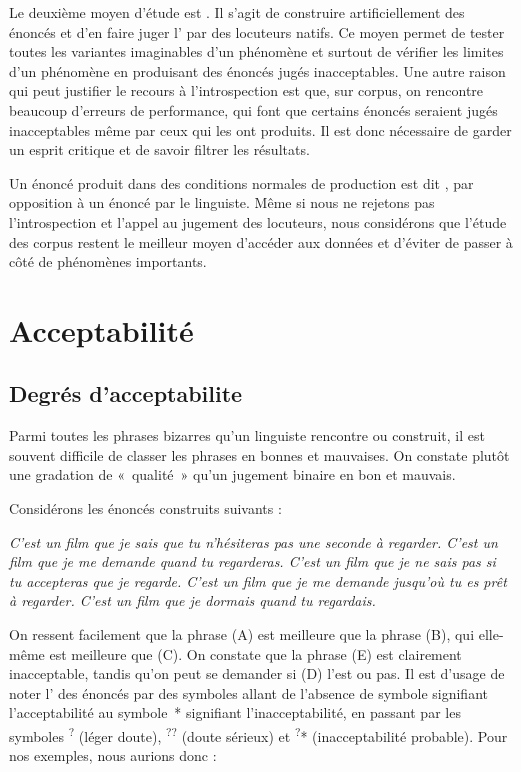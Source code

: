 Le deuxième moyen d’étude est . Il s’agit de construire artificielle\-ment des énoncés et d’en faire juger l’ par des locuteurs natifs. Ce moyen permet de tester toutes les variantes imaginables d’un phénomène et surtout de vérifier les limites d’un phénomène en produisant des énoncés jugés inacceptables. Une autre raison qui peut justifier le recours à l’introspection est que, sur corpus, on rencontre beaucoup d’erreurs de performance, qui font que certains énoncés seraient jugés inacceptables même par ceux qui les ont produits. Il est donc nécessaire de garder un esprit critique et de savoir filtrer les résultats.

Un énoncé produit dans des conditions normales de production est dit , par opposition à un énoncé  par le linguiste. Même si nous ne rejetons pas l’introspection et l’appel au jugement des locuteurs, nous considérons que l’étude des corpus restent le meilleur moyen d’accéder aux données et d’éviter de passer à côté de phénomènes importants.

\section{Acceptabilité}\label{sec:1.1.11}
\subsection{Degrés d'acceptabilite}
Parmi toutes les phrases bizarres qu’un linguiste rencontre ou construit, il est souvent difficile de classer les phrases en bonnes et mauvaises. On constate plutôt une gradation de «~qualité~» qu’un jugement binaire en bon et mauvais.

Considérons les énoncés construits suivants :

\ea
\ea \itshape C’est un film que je sais que tu n’hésiteras pas une seconde à regarder.
\ex \itshape C’est un film que je me demande quand tu regarderas.
\ex \itshape C’est un film que je ne sais pas si tu accepteras que je regarde.
\ex \itshape C’est un film que je me demande jusqu’où tu es prêt à regarder.
\ex \itshape C’est un film que je dormais quand tu regardais.
\z
\z

On ressent facilement que la phrase (A) est meilleure que la phrase (B), qui elle-même est meilleure que (C). On constate que la phrase (E) est clairement inacceptable, tandis qu’on peut se demander si (D) l’est ou pas. Il est d’usage de noter l’ des énoncés par des symboles allant de l’absence de symbole signifiant l’acceptabilité au symbole~* signifiant l’inacceptabilité, en passant par les symboles \textsuperscript{?} (léger doute), \textsuperscript{??} (doute sérieux) et \textsuperscript{?}* (inacceptabilité probable). Pour nos exemples, nous aurions donc :

